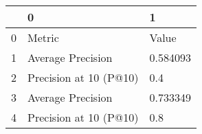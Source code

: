 \begin{tabular}{lll}
\toprule
{} &                       0 &         1 \\
\midrule
0 &                  Metric &     Value \\
1 &       Average Precision &  0.584093 \\
2 &  Precision at 10 (P@10) &       0.4 \\
3 &       Average Precision &  0.733349 \\
4 &  Precision at 10 (P@10) &       0.8 \\
\bottomrule
\end{tabular}
